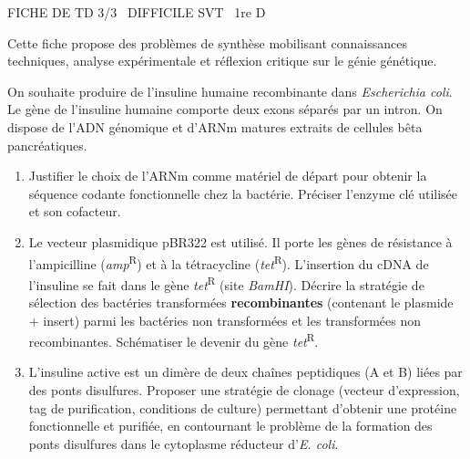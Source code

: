 \documentclass[11pt]{article}
\begin{document}
\begin{tcolorbox}[enhanced,colback=popink,colframe=popink,arc=10pt,boxrule=0pt,left=12pt,right=12pt,top=9pt,bottom=9pt]
{\color{white}\popxbold\small FICHE DE TD 3/3 \textbullet\ DIFFICILE \hfill SVT \textbullet\ 1re D\par}
\end{tcolorbox}
\vspace{4pt}
Cette fiche propose des problèmes de synthèse mobilisant connaissances techniques, analyse expérimentale et réflexion critique sur le génie génétique.

\begin{exercice}
On souhaite produire de l'insuline humaine recombinante dans \textit{Escherichia coli}. Le gène de l'insuline humaine comporte deux exons séparés par un intron. On dispose de l'ADN génomique et d'ARNm matures extraits de cellules bêta pancréatiques.
\begin{enumerate}
    \item Justifier le choix de l'ARNm comme matériel de départ pour obtenir la séquence codante fonctionnelle chez la bactérie. Préciser l'enzyme clé utilisée et son cofacteur.
    \item Le vecteur plasmidique pBR322 est utilisé. Il porte les gènes de résistance à l'ampicilline (\textit{amp}\textsuperscript{R}) et à la tétracycline (\textit{tet}\textsuperscript{R}). L'insertion du cDNA de l'insuline se fait dans le gène \textit{tet}\textsuperscript{R} (site \textit{BamHI}). Décrire la stratégie de sélection des bactéries transformées \textbf{recombinantes} (contenant le plasmide + insert) parmi les bactéries non transformées et les transformées non recombinantes. Schématiser le devenir du gène \textit{tet}\textsuperscript{R}.
    \item L'insuline active est un dimère de deux chaînes peptidiques (A et B) liées par des ponts disulfures. Proposer une stratégie de clonage (vecteur d'expression, tag de purification, conditions de culture) permettant d'obtenir une protéine fonctionnelle et purifiée, en contournant le problème de la formation des ponts disulfures dans le cytoplasme réducteur d'\textit{E. coli}.
\end{enumerate}
\end{exercice}
\end{document}
